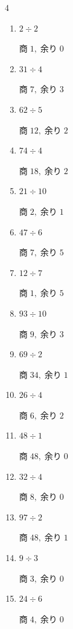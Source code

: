 \begin{multicols}{4}
\begin{enumerate}
        $商\; 6,\; 余り\; 4$

  \item $2 \div 2$

        $商\; 1,\; 余り\; 0$

  \item $31 \div 4$

        $商\; 7,\; 余り\; 3$

  \item $62 \div 5$

        $商\; 12,\; 余り\; 2$

  \item $74 \div 4$

        $商\; 18,\; 余り\; 2$

  \item $21 \div 10$

        $商\; 2,\; 余り\; 1$

  \item $47 \div 6$

        $商\; 7,\; 余り\; 5$

  \item $12 \div 7$

        $商\; 1,\; 余り\; 5$

  \item $93 \div 10$

        $商\; 9,\; 余り\; 3$

  \item $69 \div 2$

        $商\; 34,\; 余り\; 1$

  \item $26 \div 4$

        $商\; 6,\; 余り\; 2$

  \item $48 \div 1$

        $商\; 48,\; 余り\; 0$

  \item $32 \div 4$

        $商\; 8,\; 余り\; 0$

  \item $97 \div 2$

        $商\; 48,\; 余り\; 1$

  \item $9 \div 3$

        $商\; 3,\; 余り\; 0$

  \item $24 \div 6$

        $商\; 4,\; 余り\; 0$


\end{enumerate}
\end{multicols}
